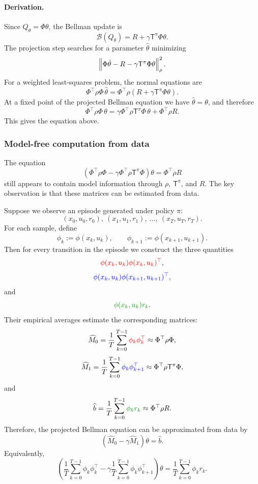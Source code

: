 \paragraph{Derivation.}
Since \(Q_\theta=\Phi\theta\), the Bellman update is
\[
\mathcal{B}(Q_\theta)
=
R+\gamma\mathsf{T}^{\pi}\Phi\theta.
\]
The projection step searches for a parameter \(\hat\theta\) minimizing
\[
\left\lVert \Phi\hat\theta-R-\gamma\mathsf{T}^{\pi}\Phi\theta \right\rVert_\rho^2.
\]
For a weighted least-squares problem, the normal equations are
\[
\Phi^\top\rho\Phi\,\hat\theta
=
\Phi^\top\rho
\left(
R+\gamma\mathsf{T}^{\pi}\Phi\theta
\right).
\]
At a fixed point of the projected Bellman equation we have \(\hat\theta=\theta\), and therefore
\[
\Phi^\top\rho\Phi\,\theta
=
\gamma\Phi^\top\rho\mathsf{T}^{\pi}\Phi\,\theta
+
\Phi^\top\rho R.
\]
This gives the equation above.

\subsubsection{Model-free computation from data}

The equation
\[
\left(
\Phi^\top\rho\Phi
-
\gamma\Phi^\top\rho\mathsf{T}^{\pi}\Phi
\right)\theta
=
\Phi^\top\rho R
\]
still appears to contain model information through \(\rho\), \(\mathsf{T}^{\pi}\), and \(R\).
The key observation is that these matrices can be estimated from data.

Suppose we observe an episode generated under policy \(\pi\):
\[
(x_0,u_0,r_0),\ (x_1,u_1,r_1),\ \dots,\ (x_T,u_T,r_T).
\]
For each sample, define
\[
\phi_k
:=
\phi(x_k,u_k),
\qquad
\phi_{k+1}
:=
\phi(x_{k+1},u_{k+1}).
\]
Then for every transition in the episode we construct the three quantities
\[
\textcolor{red}{\phi(x_k,u_k)\phi(x_k,u_k)^\top},
\]
\[
\textcolor{blue}{\phi(x_k,u_k)\phi(x_{k+1},u_{k+1})^\top},
\]
and
\[
\textcolor{green!60!black}{\phi(x_k,u_k)r_k}.
\]
Their empirical averages estimate the corresponding matrices:
\[
\widehat M_0
=
\frac{1}{T}\sum_{k=0}^{T-1}
\textcolor{red}{\phi_k\phi_k^\top}
\approx
\Phi^\top\rho\Phi,
\]
\[
\widehat M_1
=
\frac{1}{T}\sum_{k=0}^{T-1}
\textcolor{blue}{\phi_k\phi_{k+1}^\top}
\approx
\Phi^\top\rho\mathsf{T}^{\pi}\Phi,
\]
and
\[
\widehat b
=
\frac{1}{T}\sum_{k=0}^{T-1}
\textcolor{green!60!black}{\phi_k r_k}
\approx
\Phi^\top\rho R.
\]
Therefore, the projected Bellman equation can be approximated from data by
\[
\left(
\widehat M_0
-
\gamma\widehat M_1
\right)\theta
=
\widehat b.
\]
Equivalently,
\[
\left(
\frac{1}{T}\sum_{k=0}^{T-1}\phi_k\phi_k^\top
-
\gamma
\frac{1}{T}\sum_{k=0}^{T-1}\phi_k\phi_{k+1}^\top
\right)\theta
=
\frac{1}{T}\sum_{k=0}^{T-1}\phi_k r_k.
\]

